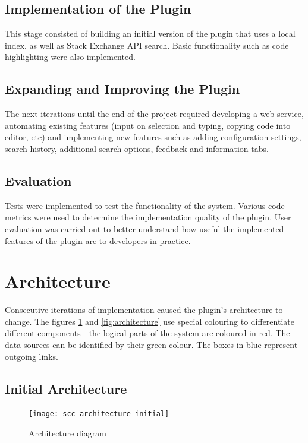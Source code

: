 \documentclass{l4proj}
\begin{document}
\subsection{Implementation of the Plugin}
This stage consisted of building an initial version of the plugin that uses a local index, as well as Stack Exchange API search. Basic functionality such as code highlighting were also implemented.

\subsection{Expanding and Improving the Plugin}
The next iterations until the end of the project required developing a web service, automating existing features (input on selection and typing, copying code into editor, etc) and implementing new features such as adding configuration settings, search history, additional search options, feedback and information tabs.

\subsection{Evaluation}
Tests were implemented to test the functionality of the system. Various code metrics were used to determine the implementation quality of the plugin. User evaluation was carried out to better understand how useful the implemented features of the plugin are to developers in practice. 

\newpage
\section{Architecture}
Consecutive iterations of implementation caused the plugin's architecture to change. The figures \ref{fig:architecture-initial} and \ref{fig:architecture} use special colouring to differentiate different components - the logical parts of the system are coloured in red. The data sources can be identified by their green colour. The boxes in blue represent outgoing links.

\subsection{Initial Architecture}

\begin{figure}[H]
\texttt{[image: scc-architecture-initial]}
\centering
\caption{Architecture diagram}\label{scc-architecture-initial}
\label{fig:architecture-initial}
\end{figure}
\end{document}
